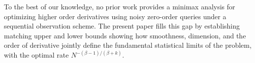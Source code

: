 \documentclass{article}
\theoremstyle{definition}
\begin{document}

To the best of our knowledge, no prior work provides a minimax analysis for optimizing higher order derivatives using noisy zero-order queries under a sequential observation scheme. The present paper fills this gap by establishing matching upper and lower bounds showing how smoothness, dimension, and the order of derivative jointly define the 
fundamental statistical limits of the problem, with the optimal rate $N^{-(\beta-1)/(\beta+k)}$. 
\end{document}

